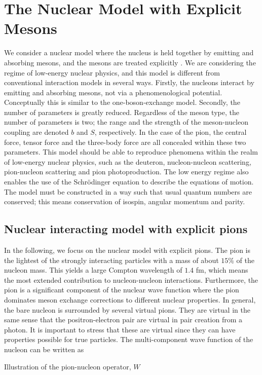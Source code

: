 \chapter{The Nuclear Model with Explicit Mesons}\label{Decsofmodel}
We consider a nuclear model where the nucleus is held together by emitting and absorbing mesons, and the mesons are treated explicitly \cite[]{Mesons}. We are considering the regime of low-energy nuclear physics, and this model is different from conventional interaction models in several ways. Firstly, the nucleons interact by emitting and absorbing mesons, not via a phenomenological potential. Conceptually this is similar to the one-boson-exchange model. Secondly, the number of parameters is greatly reduced. Regardless of the meson type, the number of parameters is two; the range and the strength of the meson-nucleon coupling are denoted $b$ and $S$, respectively. In the case of the pion, the central force, tensor force and the three-body force are all concealed within these two parameters. This model should be able to reproduce phenomena within the realm of low-energy nuclear physics, such as the deuteron, nucleon-nucleon scattering, pion-nucleon scattering and pion photoproduction. The low energy regime also enables the use of the Schrödinger equation to describe the equations of motion. The model must be constructed in a way such that usual quantum numbers are conserved; this means conservation of isospin, angular momentum and parity. 

\section{Nuclear interacting model with explicit pions }\label{sec:model}

In the following, we focus on the nuclear model with explicit pions. The pion is the lightest of the strongly interacting particles with a mass of about $15\%$ of the nucleon mass. This yields a large Compton wavelength of $1.4$ fm, which means the most extended contribution to nucleon-nucleon interactions. Furthermore, the pion is a significant component of the nuclear wave function where the pion dominates meson exchange corrections to different nuclear properties. In general, the bare nucleon is surrounded by several virtual pions. 
They are virtual in the same sense that the positron-electron pair are virtual in pair creation from a photon. It is important to stress that these are virtual since they can have properties possible for true particles. The multi-component wave function of the nucleon can be written as
\begin{marginfigure}
	\centering
	
	\caption{Illustration of the pion-nucleon operator, $W$}
	\label{fig:superposition}
\end{marginfigure}

